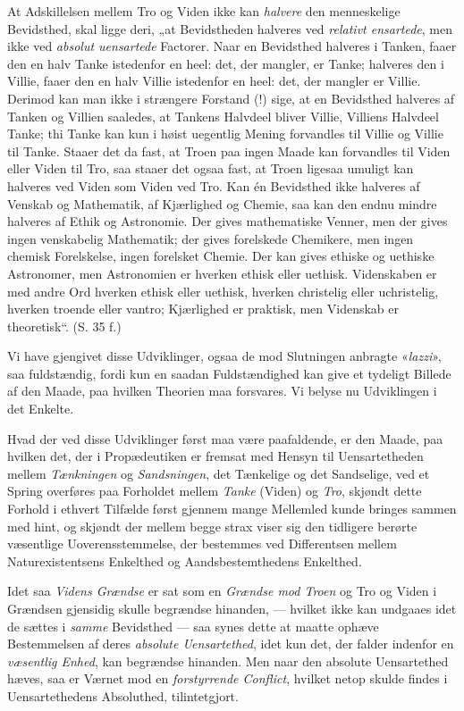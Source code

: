 \documentclass[12pt,a4paper]{book}
\newcommand{\opage}[1]{\marginnote{\footnotesize\textit{[#1]}}}
\begin{document}
At Adskillelsen mellem Tro og Viden ikke kan \emph{halvere} den menneskelige Bevidsthed, skal ligge
deri, „at Be\opage{183}vidstheden halveres ved \emph{relativt ensartede}, men ikke ved \emph{absolut
uensartede} Factorer. Naar en Bevidsthed halveres i Tanken, faaer den en halv Tanke istedenfor
en heel: det, der mangler, er Tanke; halveres den i Villie, faaer den en halv Villie istedenfor
en heel: det, der mangler er Villie. Derimod kan man ikke i strængere Forstand (!) sige, at en
Bevidsthed halveres af Tanken og Villien saaledes, at Tankens Halvdeel bliver Villie, Villiens
Halvdeel Tanke; thi Tanke kan kun i høist uegentlig Mening forvandles til Villie og Villie til
Tanke. Staaer det da fast, at Troen paa ingen Maade kan forvandles til Viden eller Viden til
Tro, saa staaer det ogsaa fast, at Troen ligesaa umuligt kan halveres ved Viden som Viden ved
Tro. Kan én Bevidsthed ikke halveres af Venskab og Mathematik, af Kjærlighed og Chemie, saa
kan den endnu mindre halveres af Ethik og Astronomie. Der gives mathematiske Venner, men der
gives ingen venskabelig Mathematik; der gives forelskede Chemikere, men ingen chemisk
Forelskelse, ingen forelsket Chemie. Der kan gives ethiske og uethiske Astronomer, men
Astronomien er hverken ethisk eller uethisk. Videnskaben er med andre Ord hverken ethisk eller
uethisk, hverken christelig eller uchristelig, hverken troende eller vantro; Kjærlighed er
praktisk, men Videnskab er theoretisk“. (S. 35 f.)

Vi have gjengivet disse Udviklinger, ogsaa de mod Slutningen anbragte «\textit{lazzi}», saa
fuldstændig, fordi kun en saadan Fuldstændighed kan give et tydeligt Billede af den Maade, paa
hvilken Theorien maa forsvares. Vi belyse nu Udviklingen i det Enkelte.

Hvad der ved disse Udviklinger først maa være paafaldende, er den Maade, paa hvilken det, der
i Propædeutiken er fremsat med Hensyn til Uensartetheden mellem \emph{Tænkningen} og \emph{Sandsningen}, det Tænkelige og det Sandselige, ved et Spring overføres paa
Forholdet mellem \emph{Tanke} (Viden) og \emph{Tro}, skjøndt dette Forhold i ethvert Tilfælde
først gjennem mange Mellemled kunde bringes sammen med hint, og skjøndt der mellem begge strax
\opage{184}viser sig den tidligere berørte væsentlige Uoverensstemmelse, der bestemmes ved Differentsen
mellem Naturexistentsens Enkelthed og Aandsbestemthedens Enkelthed.

Idet saa \emph{Videns Grændse} er sat som en \emph{Grændse mod Troen} og Tro og Viden i
Grændsen gjensidig skulle begrændse hinanden, --- hvilket ikke kan undgaaes idet de sættes i \emph{samme} Bevidsthed --- saa synes dette at maatte ophæve Bestemmelsen af deres \emph{absolute
Uensartethed}, idet kun det, der falder indenfor en \emph{væsentlig Enhed}, kan begrændse hinanden.
Men naar den absolute Uensartethed hæves, saa er Værnet mod en \emph{forstyrrende Conflict}, hvilket
netop skulde findes i Uensartethedens Absoluthed, tilintetgjort.
\end{document}
